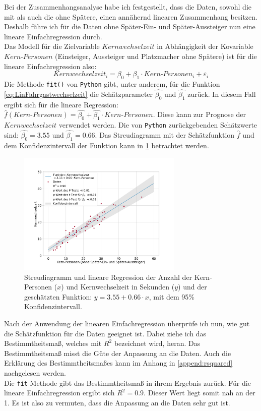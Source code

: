 Bei der Zusammenhangsanalyse habe ich festgestellt, dass die Daten, sowohl die mit als auch die ohne Spätere, einen annähernd linearen Zusammenhang besitzen. Deshalb führe ich für die Daten ohne Später-Ein- und Später-Aussteiger nun eine lineare Einfachregression durch.\\
Das Modell für die Zielvariable $Kernwechselzeit$ in Abhängigkeit der Kovariable $Kern\text{-}Personen$ (Einsteiger, Aussteiger und Platzmacher ohne Spätere) ist für die lineare Einfachregression also:
\begin{equation}
Kernwechselzeit_i = \beta_0 + \beta_1 \cdot Kern\text{-}Personen_i + \varepsilon_i
\label{eq:LinFahrgastwechselzeit}
\end{equation} 
Die Methode \texttt{fit()} von \texttt{Python} gibt, unter anderem, für die Funktion \ref{eq:LinFahrgastwechselzeit} die Schätzparameter $\hat{\beta_0}$ und $\hat{\beta_1}$ zurück. In diesem Fall ergibt sich für die lineare Regression: $\hat{f}(Kern\text{-}Personen) = \hat{\beta_0} + \hat{\beta_1} \cdot Kern\text{-}Personen$. Diese kann zur Prognose der $Kernwechselzeit$ verwendet werden.
Die von \texttt{Python} zurückgebenden Schätzwerte sind: $\hat{\beta_0}=3.55$ und $\hat{\beta_1}=0.66$. Das Streudiagramm mit der Schätzfunktion $\hat{f}$ und dem Konfidenzintervall der Funktion kann in \figurename \ref{fig:LinReg} betrachtet werden.
\begin{figure}[H]
	\centering
		\includegraphics[width=0.7\textwidth]{pictures/data_evaluation/transferTime/lin_core_transfer_time.png}
	\caption{Streudiagramm und lineare Regression der Anzahl der Kern-Personen ($x$) und Kernwechselzeit in Sekunden ($y$) und der geschätzten Funktion: $y = 3.55 + 0.66 \cdot x$, mit dem 95\% Konfidenzintervall.}
	\label{fig:LinReg}
\end{figure}
Nach der Anwendung der linearen Einfachregression überprüfe ich nun, wie gut die Schätzfunktion für die Daten geeignet ist. Dabei ziehe ich das Bestimmtheitsmaß, welches mit $R^2$ bezeichnet wird, heran. Das Bestimmtheitsmaß misst die Güte der Anpassung an die Daten. Auch die Erklärung des Bestimmtheitsmaßes kann im Anhang in \ref{append:rsquared} nachgelesen werden. \\
Die \texttt{fit} Methode gibt das Bestimmtheitsmaß in ihrem Ergebnis zurück. Für die lineare Einfachregression ergibt sich $R^2=0.9$. Dieser Wert liegt somit nah an der 1. Es ist also zu vermuten, dass die Anpassung an die Daten sehr gut ist. 

